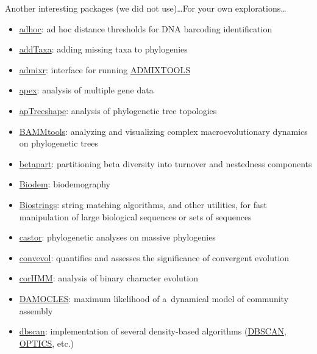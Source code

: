 \documentclass[compress, ucs, xelatex, 11pt, xcolor=svgnames, aspectratio=169,
	hyperref={
		bookmarks=true,
		unicode=true,
		colorlinks=true,
		pdftitle={Molecular data in R},
		plainpages=false,
		pdfauthor={Vojtech Zeisek},
		pdfsubject={Course about phylogeny and evolution in R},
		pdfcreator={XeLaTeX},
		pdfkeywords={R, evolution, phylogeny, molecular data},
		linkcolor=Crimson, %
		anchorcolor=Magenta, %
		citecolor=Magenta, %
		filecolor=Magenta, %
		menucolor=Magenta, %
		urlcolor=DodgerBlue, %
		pdftex},
	url={hyphens, lowtilde} %
	]{beamer}
\begin{document}
\begin{frame}[allowframebreaks]{Another interesting packages (we did not use)\ldots}{For your own explorations\ldots}
	\begin{itemize}
		\item \href{https://CRAN.R-project.org/package=adhoc}{adhoc}: ad hoc distance thresholds for DNA barcoding identification
		\item \href{https://github.com/eliotmiller/addTaxa}{addTaxa}: adding missing taxa to phylogenies
		\item \href{https://CRAN.R-project.org/package=admixr}{admixr}: interface for running \href{https://academic.oup.com/genetics/article/192/3/1065/5935193}{ADMIXTOOLS}
		\item \href{https://CRAN.R-project.org/package=apex}{apex}: analysis of multiple gene data
		\item \href{https://CRAN.R-project.org/package=apTreeshape}{apTreeshape}: analysis of phylogenetic tree topologies
		\item \href{https://CRAN.R-project.org/package=BAMMtools}{BAMMtools}: analyzing and visualizing complex macroevolutionary dynamics on phylogenetic trees
		\item \href{https://CRAN.R-project.org/package=betapart}{betapart}: partitioning beta diversity into turnover and nestedness components
		\item \href{https://CRAN.R-project.org/package=Biodem}{Biodem}: biodemography
		\item \href{https://www.bioconductor.org/packages/release/bioc/html/Biostrings.html}{Biostrings}: string matching algorithms, and other utilities, for fast manipulation of large biological sequences or sets of sequences
		\item \href{https://CRAN.R-project.org/package=castor}{castor}: phylogenetic analyses on massive phylogenies
		\item \href{https://CRAN.R-project.org/package=convevol}{convevol}: quantifies and assesses the significance of convergent evolution
		\item \href{https://CRAN.R-project.org/package=corHMM}{corHMM}: analysis of binary character evolution
		\item \href{https://CRAN.R-project.org/package=DAMOCLES}{DAMOCLES}: maximum likelihood of a~dynamical model of community assembly
		\item \href{https://CRAN.R-project.org/package=dbscan}{dbscan}: implementation of several density-based algorithms (\href{https://en.wikipedia.org/wiki/DBSCAN}{DBSCAN}, \href{https://en.wikipedia.org/wiki/OPTICS_algorithm}{OPTICS}, etc.)

\end{itemize}
\end{frame}
\end{document}
